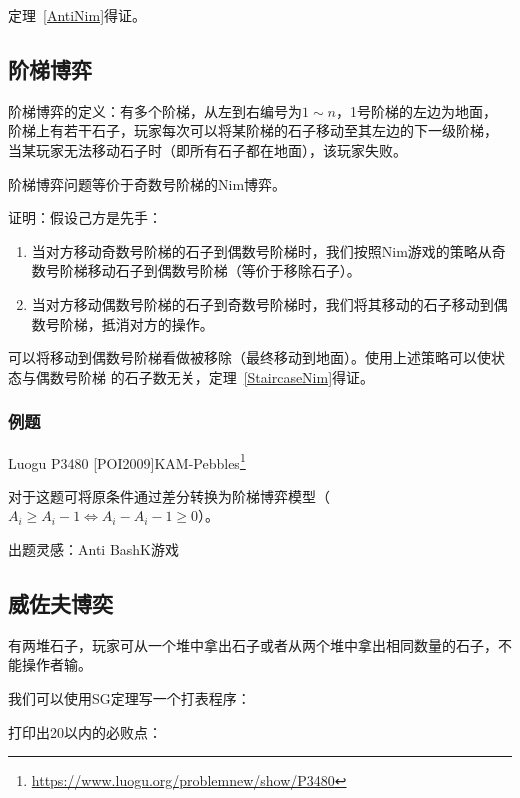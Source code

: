 定理~\ref{AntiNim}得证。

\subsection{阶梯博弈}
阶梯博弈的定义：有多个阶梯，从左到右编号为$1\sim n$，1号阶梯的左边为地面，
阶梯上有若干石子，玩家每次可以将某阶梯的石子移动至其左边的下一级阶梯，
当某玩家无法移动石子时（即所有石子都在地面），该玩家失败。

\begin{theorem}\label{StaircaseNim}
	阶梯博弈问题等价于奇数号阶梯的Nim博弈。
\end{theorem}

证明：假设己方是先手：

\begin{enumerate}
	\item 当对方移动奇数号阶梯的石子到偶数号阶梯时，我们按照Nim游戏的策略从奇
	      数号阶梯移动石子到偶数号阶梯（等价于移除石子）。
	\item 当对方移动偶数号阶梯的石子到奇数号阶梯时，我们将其移动的石子移动到偶
	      数号阶梯，抵消对方的操作。
\end{enumerate}

可以将移动到偶数号阶梯看做被移除（最终移动到地面）。使用上述策略可以使状态与偶数号阶梯
的石子数无关，定理~\ref{StaircaseNim}得证。

\subsubsection{例题}

Luogu P3480 [POI2009]KAM-Pebbles\footnote{
	\url{https://www.luogu.org/problemnew/show/P3480}
}

对于这题可将原条件通过差分转换为阶梯博弈模型（$A_i \geq A_i-1 \Leftrightarrow
	A_i-A_i-1 \geq 0$）。



出题灵感：Anti BashK游戏

\subsection{威佐夫博奕}
有两堆石子，玩家可从一个堆中拿出石子或者从两个堆中拿出相同数量的石子，不能操作者输。

我们可以使用SG定理写一个打表程序：


打印出20以内的必败点：

